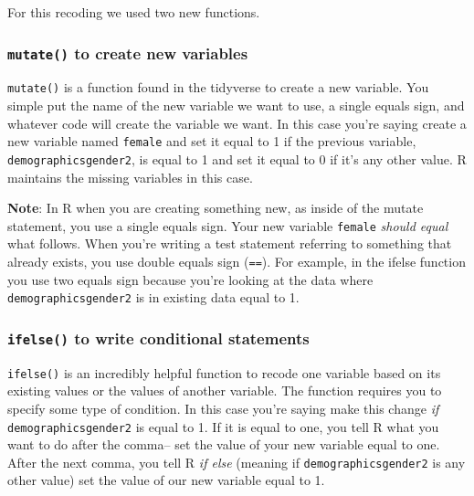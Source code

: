 \documentclass[
]{book}
\begin{document}
For this recoding we used two new functions.

\hypertarget{mutate}{%
\subsubsection*{\texorpdfstring{\texttt{mutate()} to create new variables}{mutate() to create new variables}}\label{mutate}}

\texttt{mutate()} is a function found in the tidyverse to create a new variable. You simple put the name of the new variable we want to use, a single equals sign, and whatever code will create the variable we want. In this case you're saying create a new variable named \texttt{female} and set it equal to 1 if the previous variable, \texttt{demographicsgender2}, is equal to 1 and set it equal to 0 if it's any other value. R maintains the missing variables in this case.

\textbf{Note}: In R when you are creating something new, as inside of the mutate statement, you use a single equals sign. Your new variable \texttt{female} \emph{should equal} what follows. When you're writing a test statement referring to something that already exists, you use double equals sign (\texttt{==}). For example, in the ifelse function you use two equals sign because you're looking at the data where \texttt{demographicsgender2} is in existing data equal to 1.

\hypertarget{ifelse}{%
\subsubsection*{\texorpdfstring{\texttt{ifelse()} to write conditional statements}{ifelse() to write conditional statements}}\label{ifelse}}

\texttt{ifelse()} is an incredibly helpful function to recode one variable based on its existing values or the values of another variable. The function requires you to specify some type of condition. In this case you're saying make this change \emph{if} \texttt{demographicsgender2} is equal to 1. If it is equal to one, you tell R what you want to do after the comma-- set the value of your new variable equal to one. After the next comma, you tell R \emph{if else} (meaning if \texttt{demographicsgender2} is any other value) set the value of our new variable equal to 1.
\end{document}

